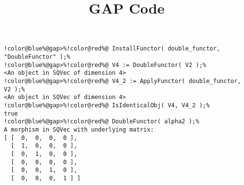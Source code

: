 \documentclass[12pt]{amsart}
\title{GAP Code}
\author{}
\begin{document}
\maketitle

\begin{Verbatim}[commandchars=!@\%,frame=single]
!color@blue%@gap>%!color@red%@ InstallFunctor( double_functor, "DoubleFunctor" );%
!color@blue%@gap>%!color@red%@ V4 := DoubleFunctor( V2 );%
<An object in SQVec of dimension 4>
!color@blue%@gap>%!color@red%@ V4_2 := ApplyFunctor( double_functor, V2 );%
<An object in SQVec of dimension 4>
!color@blue%@gap>%!color@red%@ IsIdenticalObj( V4, V4_2 );%
true
!color@blue%@gap>%!color@red%@ DoubleFunctor( alpha2 );%
A morphism in SQVec with underlying matrix:
[ [  0,  0,  0,  0 ],
  [  1,  0,  0,  0 ],
  [  0,  1,  0,  0 ],
  [  0,  0,  0,  0 ],
  [  0,  0,  1,  0 ],
  [  0,  0,  0,  1 ] ]

\end{Verbatim}
\end{document}
